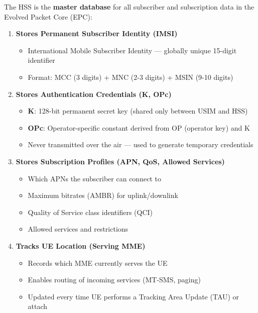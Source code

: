The HSS is the \textbf{master database} for all subscriber and subscription data in the Evolved Packet Core (EPC):



\begin{enumerate}
\def\labelenumi{\arabic{enumi}.}
\tightlist
\item
  \textbf{Stores Permanent Subscriber Identity (IMSI)}

  \begin{itemize}
  \tightlist
  \item
    International Mobile Subscriber Identity — globally unique 15-digit identifier
  \item
    Format: MCC (3 digits) + MNC (2-3 digits) + MSIN (9-10 digits)
  \end{itemize}
\item
  \textbf{Stores Authentication Credentials (K, OPc)}

  \begin{itemize}
  \tightlist
  \item
    \textbf{K}: 128-bit permanent secret key (shared only between USIM and HSS)
  \item
    \textbf{OPc}: Operator-specific constant derived from OP (operator key) and K
  \item
    Never transmitted over the air — used to generate temporary credentials
  \end{itemize}
\item
  \textbf{Stores Subscription Profiles (APN, QoS, Allowed Services)}

  \begin{itemize}
  \tightlist
  \item
    Which APNs the subscriber can connect to
  \item
    Maximum bitrates (AMBR) for uplink/\allowbreak{}downlink
  \item
    Quality of Service class identifiers (QCI)
  \item
    Allowed services and restrictions
  \end{itemize}
\item
  \textbf{Tracks UE Location (Serving MME)}

  \begin{itemize}
  \tightlist
  \item
    Records which MME currently serves the UE
  \item
    Enables routing of incoming services (MT-SMS, paging)
  \item
    Updated every time UE performs a Tracking Area Update (TAU) or attach
  \end{itemize}
\end{enumerate}

